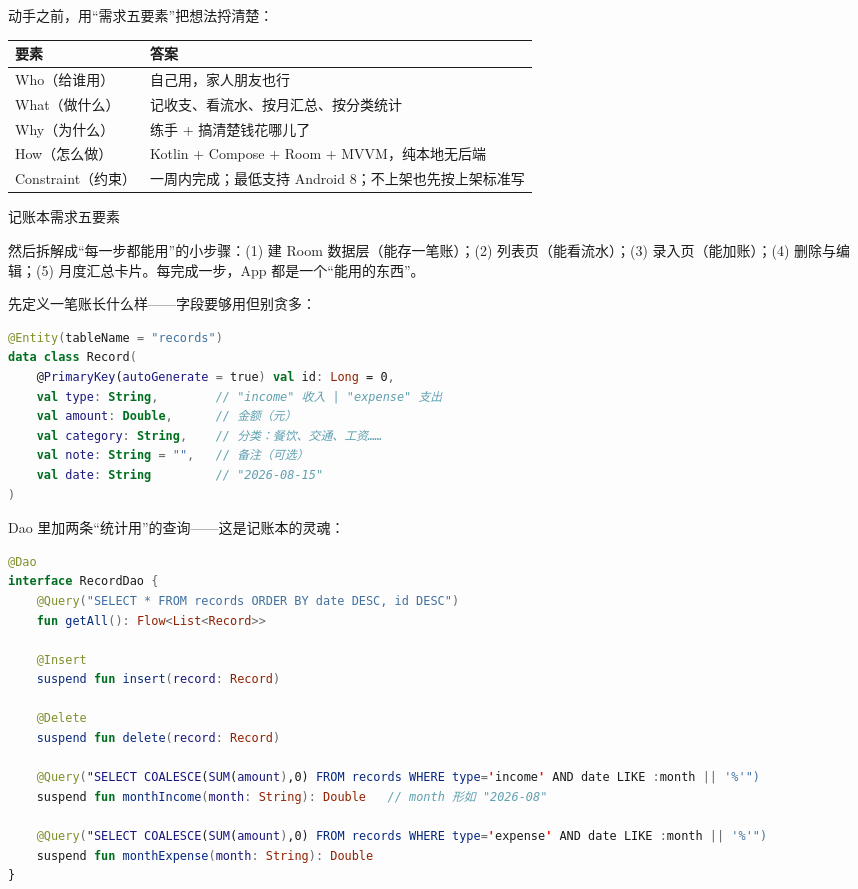 


动手之前，用“需求五要素”把想法捋清楚：

\begin{center}
\begin{tabularx}{\linewidth}{|X|X|}
\hline
\textbf{要素} & \textbf{答案} \tabularnewline
\hline
Who（给谁用） & 自己用，家人朋友也行 \tabularnewline
What（做什么） & 记收支、看流水、按月汇总、按分类统计 \tabularnewline
Why（为什么） & 练手 + 搞清楚钱花哪儿了 \tabularnewline
How（怎么做） & Kotlin + Compose + Room + MVVM，纯本地无后端 \tabularnewline
Constraint（约束） & 一周内完成；最低支持 Android 8；不上架也先按上架标准写 \tabularnewline
\hline
\end{tabularx}
\end{center}

\begin{center}\small\color{gray}记账本需求五要素\end{center}

然后拆解成“每一步都能用”的小步骤：(1) 建 Room 数据层（能存一笔账）；(2) 列表页（能看流水）；(3) 录入页（能加账）；(4) 删除与编辑；(5) 月度汇总卡片。每完成一步，App 都是一个“能用的东西”。


先定义一笔账长什么样——字段要够用但别贪多：

\begin{lstlisting}[language=Kotlin]
@Entity(tableName = "records")
data class Record(
    @PrimaryKey(autoGenerate = true) val id: Long = 0,
    val type: String,        // "income" 收入 | "expense" 支出
    val amount: Double,      // 金额（元）
    val category: String,    // 分类：餐饮、交通、工资……
    val note: String = "",   // 备注（可选）
    val date: String         // "2026-08-15"
)
\end{lstlisting}

Dao 里加两条“统计用”的查询——这是记账本的灵魂：

\begin{lstlisting}[language=Kotlin]
@Dao
interface RecordDao {
    @Query("SELECT * FROM records ORDER BY date DESC, id DESC")
    fun getAll(): Flow<List<Record>>

    @Insert
    suspend fun insert(record: Record)

    @Delete
    suspend fun delete(record: Record)

    @Query("SELECT COALESCE(SUM(amount),0) FROM records WHERE type='income' AND date LIKE :month || '%'")
    suspend fun monthIncome(month: String): Double   // month 形如 "2026-08"

    @Query("SELECT COALESCE(SUM(amount),0) FROM records WHERE type='expense' AND date LIKE :month || '%'")
    suspend fun monthExpense(month: String): Double
}
\end{lstlisting}

